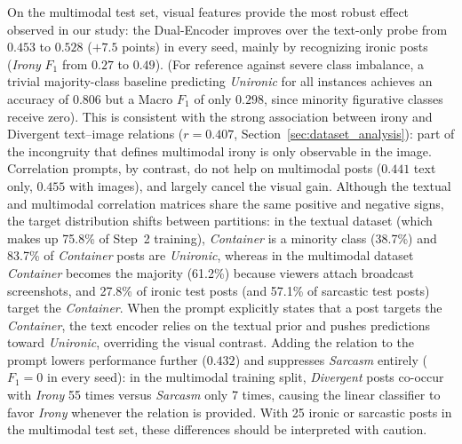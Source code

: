 On the multimodal test set, visual features provide the most robust effect observed in our study: the Dual-Encoder improves over the text-only probe from $0.453$ to $0.528$ ($+7.5$ points) in every seed, mainly by recognizing ironic posts (\textit{Irony} $F_1$ from $0.27$ to $0.49$). (For reference against severe class imbalance, a trivial majority-class baseline predicting \textit{Unironic} for all instances achieves an accuracy of $0.806$ but a Macro $F_1$ of only $0.298$, since minority figurative classes receive zero). This is consistent with the strong association between irony and Divergent text--image relations ($r = 0.407$, Section~\ref{sec:dataset_analysis}): part of the incongruity that defines multimodal irony is only observable in the image. Correlation prompts, by contrast, do not help on multimodal posts ($0.441$ text only, $0.455$ with images), and largely cancel the visual gain. Although the textual and multimodal correlation matrices share the same positive and negative signs, the target distribution shifts between partitions: in the textual dataset (which makes up 75.8\% of Step~2 training), \textit{Container} is a minority class (38.7\%) and 83.7\% of \textit{Container} posts are \textit{Unironic}, whereas in the multimodal dataset \textit{Container} becomes the majority (61.2\%) because viewers attach broadcast screenshots, and 27.8\% of ironic test posts (and 57.1\% of sarcastic test posts) target the \textit{Container}. When the prompt explicitly states that a post targets the \textit{Container}, the text encoder relies on the textual prior and pushes predictions toward \textit{Unironic}, overriding the visual contrast. Adding the relation to the prompt lowers performance further ($0.432$) and suppresses \textit{Sarcasm} entirely ($F_1 = 0$ in every seed): in the multimodal training split, \textit{Divergent} posts co-occur with \textit{Irony} 55 times versus \textit{Sarcasm} only 7 times, causing the linear classifier to favor \textit{Irony} whenever the relation is provided. With 25 ironic or sarcastic posts in the multimodal test set, these differences should be interpreted with caution.


